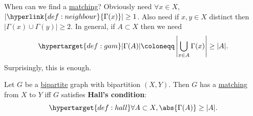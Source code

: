 \documentclass{article}
\begin{document}
When can we find a \hyperlink{def:matching}{matching}?
Obviously need $\forall x \in X$, $|\hyperlink{def:neighbour}{\Gamma(x)}| \geq 1$.
Also need if $x,y \in X$ distinct then $|\Gamma(x) \cup \Gamma(y)| \geq 2$.
In general, if $A \subset X$ then we need
\begin{equation*}
    \hypertarget{def:gam}|\Gamma(A)| \coloneqq \left|\bigcup_{x \in A} \Gamma(x)\right| \geq |A|.
\end{equation*}
Surprisingly, this is enough.
\begin{nthm}\label{thm:31}
    Let $G$ be a \hyperlink{def:bipartite}{bipartite} graph with bipartition $(X,Y)$.
    Then $G$ has a \hyperlink{def:matching}{matching} from $X$ to $Y$ iff $G$ satisfies \textbf{Hall's condition}:
    \begin{equation*}
        \hypertarget{def:hall}\forall A \subset X, \abs{\Gamma(A)} \geq |A|.
    \end{equation*}
\end{nthm}
\end{document}
